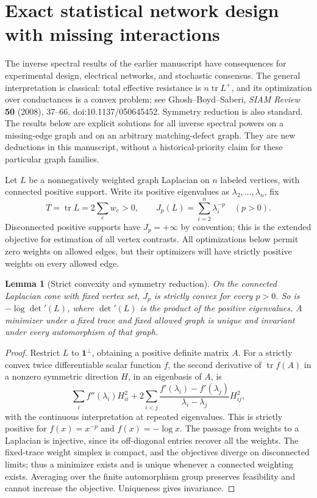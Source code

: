 \documentclass[11pt,a4paper]{article}
\newtheorem{lemma}[theorem]{Lemma}
\theoremstyle{definition}
\theoremstyle{remark}
\numberwithin{equation}{section}
\begin{document}
\section{Exact statistical network design with missing interactions}
\label{p1:sec:transfer-spectral-design}

The inverse spectral results of the earlier manuscript have consequences
for experimental design, electrical networks, and stochastic consensus.
The general interpretation is classical: total effective resistance is
$n\operatorname{tr}L^+$, and its optimization over conductances is a convex
problem; see Ghosh--Boyd--Saberi, \emph{SIAM Review} \textbf{50} (2008),
37--66, doi:10.1137/050645452.  Symmetry reduction is also standard.
The results below are explicit solutions for all inverse spectral powers
on a missing-edge graph and on an arbitrary matching-defect graph.
They are new deductions in this manuscript, without a historical-priority
claim for these particular graph families.

Let $L$ be a nonnegatively weighted graph Laplacian on $n$ labeled
vertices, with connected positive support.  Write its positive eigenvalues
as $\lambda_2,\ldots,\lambda_n$, fix
\[
 T=\operatorname{tr}L=2\sum_e w_e>0,
 \qquad J_p(L)=\sum_{i=2}^n\lambda_i^{-p}\quad(p>0).
\]
Disconnected positive supports have $J_p=+\infty$ by convention; this is
the extended objective for estimation of all vertex contrasts.
All optimizations below permit zero weights on allowed edges, but their
optimizers will have strictly positive weights on every allowed edge.

\begin{lemma}[Strict convexity and symmetry reduction]
\label{p1:lem:design-strict-convexity}
On the connected Laplacian cone with fixed vertex set, $J_p$ is strictly
convex for every $p>0$.  So is $-\log\det'(L)$, where $\det'(L)$ is the
product of the positive eigenvalues.  A minimizer under a fixed trace and
fixed allowed graph is unique and invariant under every automorphism of
that graph.
\end{lemma}
\begin{proof}
Restrict $L$ to $\mathbf1^\perp$, obtaining a positive definite matrix
$A$.  For a strictly convex twice differentiable scalar function $f$, the
second derivative of $\operatorname{tr}f(A)$ in a nonzero symmetric
direction $H$, in an eigenbasis of $A$, is
\[
 \sum_i f''(\lambda_i)H_{ii}^2+
 2\sum_{i<j}
 \frac{f'(\lambda_i)-f'(\lambda_j)}{\lambda_i-\lambda_j}H_{ij}^2,
\]
with the continuous interpretation at repeated eigenvalues.  This is
strictly positive for $f(x)=x^{-p}$ and $f(x)=-\log x$.
The passage from weights to a Laplacian is injective, since its
off-diagonal entries recover all the weights.  The fixed-trace weight
simplex is compact, and the objectives diverge on disconnected limits;
thus a minimizer exists and is unique whenever a connected weighting
exists.  Averaging over the finite automorphism group preserves feasibility
and cannot increase the objective.  Uniqueness gives invariance.
\end{proof}
\end{document}
